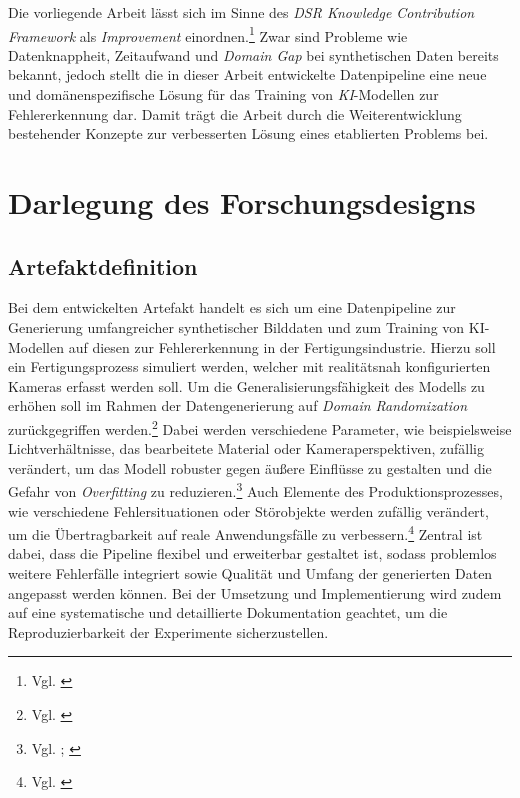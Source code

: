 Die vorliegende Arbeit lässt sich im Sinne des \textit{\ac{DSR} Knowledge Contribution Framework} als \textit{Improvement} einordnen.\footnote{Vgl. \cite[S. 345 f.]{the_australian_national_university_positioning_2013}} Zwar sind Probleme wie Datenknappheit, Zeitaufwand und \textit{Domain Gap} bei synthetischen Daten bereits bekannt, jedoch stellt die in dieser Arbeit entwickelte Datenpipeline eine neue und domänenspezifische Lösung für das Training von \textit{KI}-Modellen zur Fehlererkennung dar. Damit trägt die Arbeit durch die Weiterentwicklung bestehender Konzepte zur verbesserten Lösung eines etablierten Problems bei.


\section{Darlegung des Forschungsdesigns}\label{sec:forschungsdesign}

\subsection{Artefaktdefinition}\label{subsec:artefaktdefinition}

Bei dem entwickelten Artefakt handelt es sich um eine Datenpipeline zur Generierung umfangreicher synthetischer Bilddaten und zum Training von \ac{KI}-Modellen auf diesen zur Fehlererkennung in der Fertigungsindustrie. Hierzu soll ein Fertigungsprozess simuliert werden, welcher mit realitätsnah konfigurierten Kameras erfasst werden soll. Um die Generalisierungsfähigkeit des Modells zu erhöhen soll im Rahmen der Datengenerierung auf \textit{Domain Randomization} zurückgegriffen werden.\footnote{Vgl. \cite[4427]{fulir_synthetic_2023}} Dabei werden verschiedene Parameter, wie beispielsweise Lichtverhältnisse, das bearbeitete Material oder Kameraperspektiven, zufällig verändert, um das Modell robuster gegen äußere Einflüsse zu gestalten und die Gefahr von \textit{Overfitting} zu reduzieren.\footnote{Vgl. \cite[263]{urgo_monitoring_2024}; \cite[4427]{fulir_synthetic_2023}} Auch Elemente des Produktionsprozesses, wie verschiedene Fehlersituationen oder Störobjekte werden zufällig verändert, um die Übertragbarkeit auf reale Anwendungsfälle zu verbessern.\footnote{Vgl. \cite[767]{monnet_investigating_2024}}
Zentral ist dabei, dass die Pipeline flexibel und erweiterbar gestaltet ist, sodass problemlos weitere Fehlerfälle integriert sowie Qualität und Umfang der generierten Daten angepasst werden können. Bei der Umsetzung und Implementierung wird zudem auf eine systematische und detaillierte Dokumentation geachtet, um die Reproduzierbarkeit der Experimente sicherzustellen.

